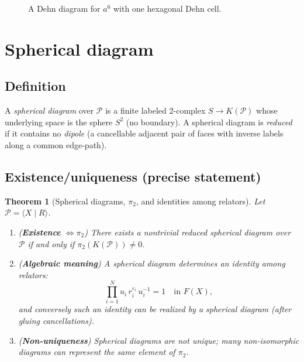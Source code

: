 \documentclass[11pt]{article}
\newtheorem{theorem}{Theorem}[section]
\theoremstyle{definition}
\theoremstyle{plain}
\theoremstyle{remark}
\begin{document}
\begin{figure}[h]
\centering
{}
\caption{A Dehn diagram for $a^6$ with one hexagonal Dehn cell.}
\end{figure}
\clearpage
\section{Spherical diagram}

\subsection*{Definition}
A \emph{spherical diagram} over $\mathcal P$ is a finite labeled 2-complex $S\to K(\mathcal P)$ whose underlying space is the sphere $S^2$ (no boundary).
A spherical diagram is \emph{reduced} if it contains no \emph{dipole} (a cancellable adjacent pair of faces with inverse labels along a common edge-path).

\subsection*{Existence/uniqueness (precise statement)}
\begin{theorem}[Spherical diagrams, $\pi_2$, and identities among relators]\label{thm:spherical}
Let $\mathcal P=\langle X\mid R\rangle$.
\begin{enumerate}[leftmargin=2.2em]
\item (\textbf{Existence} $\Leftrightarrow \pi_2$) There exists a nontrivial reduced spherical diagram over $\mathcal P$
if and only if $\pi_2(K(\mathcal P))\neq 0$.
\item (\textbf{Algebraic meaning}) A spherical diagram determines an \emph{identity among relators}:
\[
\prod_{i=1}^N u_i\, r_i^{\varepsilon_i}\,u_i^{-1}=1 \quad\text{in }F(X),
\]
and conversely such an identity can be realized by a spherical diagram (after gluing cancellations).
\item (\textbf{Non-uniqueness}) Spherical diagrams are not unique; many non-isomorphic diagrams can represent the same element of $\pi_2$.
\end{enumerate}
\end{theorem}
\end{document}
